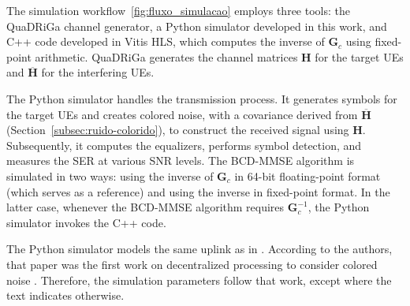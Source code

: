The simulation workflow~\ref{fig:fluxo_simulacao} employs three tools: the QuaDRiGa channel generator, a Python simulator developed in this work, and C++ code developed in Vitis HLS, which computes the inverse of $\mathbf{G}_c$ using fixed-point arithmetic. QuaDRiGa generates the channel matrices $\mathbf{H}$ for the target UEs and $\overline{\mathbf{H}}$ for the interfering UEs.

The Python simulator handles the transmission process. It generates symbols for the target UEs and creates colored noise, with a covariance derived from $\overline{\mathbf{H}}$ (Section~\ref{subsec:ruido-colorido}), to construct the received signal using $\mathbf{H}$. Subsequently, it computes the equalizers, performs symbol detection, and measures the SER at various SNR levels. The BCD-MMSE algorithm is simulated in two ways: using the inverse of $\mathbf{G}_c$ in 64-bit floating-point format (which serves as a reference) and using the inverse in fixed-point format. In the latter case, whenever the BCD-MMSE algorithm requires $\mathbf{G}_c^{-1}$, the Python simulator invokes the C++ code.

The Python simulator models the same uplink as in \cite{zhao2025jsac}. According to the authors, that paper was the first work on decentralized processing to consider colored noise \cite{zhao2025jsac}. Therefore, the simulation parameters follow that work, except where the text indicates otherwise.



